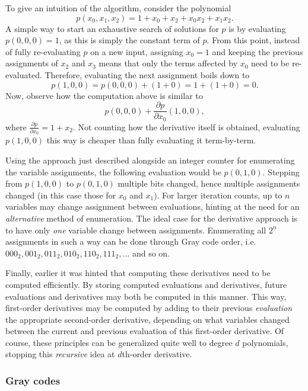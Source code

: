 To give an intuition of the algorithm, consider the polynomial
$$
    p(x_0, x_1, x_2) = 1 + x_0 + x_2 + x_0x_2 + x_1x_2.
$$
A simple way to start an exhaustive search of solutions for $p$ is by evaluating $p(0, 0, 0) = 1$, as this is simply the constant term of $p$. From this point, instead of fully re-evaluating $p$ on a new input, assigning $x_0 = 1$ and keeping the previous assignments of $x_2$ and $x_3$ means that only the terms affected by $x_0$ need to be re-evaluated. Therefore, evaluating the next assignment boils down to 
$$
    p(1, 0, 0) = p(0, 0, 0) + (1 + 0) = 1 + (1 + 0) = 0.
$$
Now, observe how the computation above is similar to 
$$
    p(0, 0, 0) + \frac{\partial p}{\partial x_0}(1, 0, 0),
$$
where $\frac{\partial p}{\partial x_0} = 1 + x_2$. Not counting how the derivative itself is obtained, evaluating $p(1, 0, 0)$ this way is cheaper than fully evaluating it term-by-term.

Using the approach just described alongside an integer counter for enumerating the variable assignments, the following evaluation would be $p(0,1,0)$. Stepping from $p(1,0,0)$ to $p(0,1,0)$ multiple bits changed, hence multiple assignments changed (in this case those for $x_0$ and $x_1$). For larger iteration counts, up to $n$ variables may change assignment between evaluations, hinting at the need for an \textit{alternative} method of enumeration. The ideal case for the derivative approach is to have only \textit{one} variable change between assignments. Enumerating all $2^n$ assignments in such a way can be done through Gray code order, i.e. $000_2, 001_2, 011_2, 010_2, 110_2, 111_2, \dots$ and so on.

Finally, earlier it was hinted that computing these derivatives need to be computed efficiently. By storing computed evaluations and derivatives, future evaluations and derivatives may both be computed in this manner. This way, first-order derivatives may be computed by adding to their previous \textit{evaluation} the appropriate second-order derivative, depending on what variables changed between the current and previous evaluation of this first-order derivative. Of course, these principles can be generalized quite well to degree $d$ polynomials, stopping this \textit{recursive} idea at $d$th-order derivative.

\subsubsection{Gray codes} \label{sec:prereq:fes:gray_codes}

